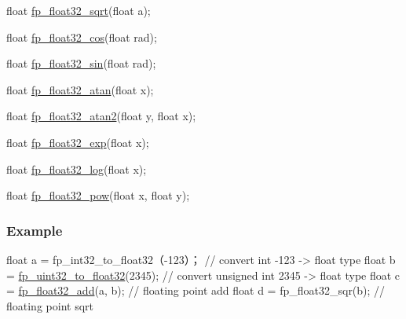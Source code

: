 \begin{DoxyCode}
\textcolor{keywordtype}{float} \mbox{\hyperlink{a00023_a310b7eb83e737130e48a8d4b0853efd5}{fp\_float32\_sqrt}}(\textcolor{keywordtype}{float} a);

\textcolor{keywordtype}{float} \mbox{\hyperlink{a00023_a76d63763a1fbbbed015ad39ff22a1a99}{fp\_float32\_cos}}(\textcolor{keywordtype}{float} rad);

\textcolor{keywordtype}{float} \mbox{\hyperlink{a00023_ae57383891f734bc754b6ade61fed3677}{fp\_float32\_sin}}(\textcolor{keywordtype}{float} rad);

\textcolor{keywordtype}{float} \mbox{\hyperlink{a00023_afff3776b0834631c841e3799f545f7a0}{fp\_float32\_atan}}(\textcolor{keywordtype}{float} x);

\textcolor{keywordtype}{float} \mbox{\hyperlink{a00023_aa7b8601248d31c15f917e4d8f4f6e9d9}{fp\_float32\_atan2}}(\textcolor{keywordtype}{float} y, \textcolor{keywordtype}{float} x);

\textcolor{keywordtype}{float} \mbox{\hyperlink{a00023_a595d6a7d9a0a116f0db5bd4cfdbcd166}{fp\_float32\_exp}}(\textcolor{keywordtype}{float} x);

\textcolor{keywordtype}{float} \mbox{\hyperlink{a00023_a694db5e30e3f76718f29bacd4e044135}{fp\_float32\_log}}(\textcolor{keywordtype}{float} x);

\textcolor{keywordtype}{float} \mbox{\hyperlink{a00023_ac888f98a6e5d89837b647d2c81725836}{fp\_float32\_pow}}(\textcolor{keywordtype}{float} x, \textcolor{keywordtype}{float} y);
\end{DoxyCode}


\subsubsection*{Example}


\begin{DoxyCode}
\textcolor{keywordtype}{float} a = fp\_int32\_to\_float32（-123）；  \textcolor{comment}{// convert int -123 -> float type}
\textcolor{keywordtype}{float} b = \mbox{\hyperlink{a00023_a096ed4a261247431549a71225761fffc}{fp\_uint32\_to\_float32}}(2345);   \textcolor{comment}{// convert unsigned int 2345 -> float type}
\textcolor{keywordtype}{float} c = \mbox{\hyperlink{a00023_a05d59640c2e2b66e3f13e423c0779ce9}{fp\_float32\_add}}(a, b);         \textcolor{comment}{// floating point add}
\textcolor{keywordtype}{float} d = fp\_float32\_sqr(b);            \textcolor{comment}{// floating point sqrt}
\end{DoxyCode}
 